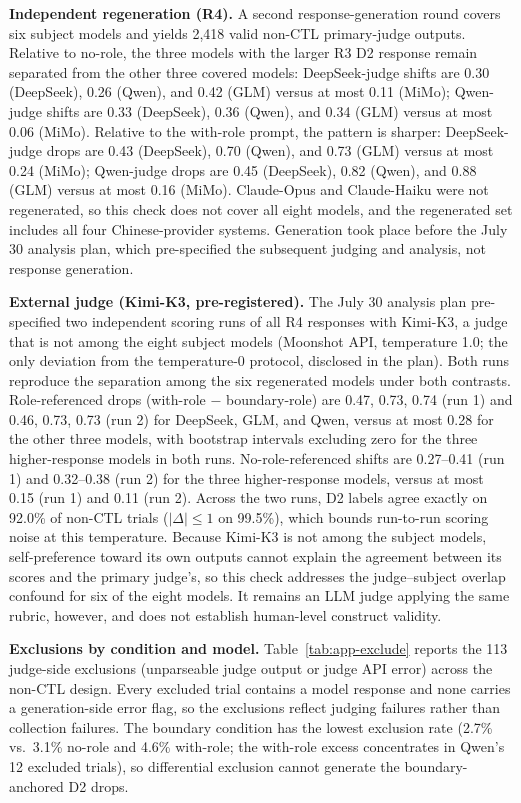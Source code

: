 \documentclass[11pt]{article}
\begin{document}
\textbf{Independent regeneration (R4).} A second response-generation round covers six subject models and yields 2,418 valid non-CTL primary-judge outputs. Relative to no-role, the three models with the larger R3 D2 response remain separated from the other three covered models: DeepSeek-judge shifts are 0.30 (DeepSeek), 0.26 (Qwen), and 0.42 (GLM) versus at most 0.11 (MiMo); Qwen-judge shifts are 0.33 (DeepSeek), 0.36 (Qwen), and 0.34 (GLM) versus at most 0.06 (MiMo). Relative to the with-role prompt, the pattern is sharper: DeepSeek-judge drops are 0.43 (DeepSeek), 0.70 (Qwen), and 0.73 (GLM) versus at most 0.24 (MiMo); Qwen-judge drops are 0.45 (DeepSeek), 0.82 (Qwen), and 0.88 (GLM) versus at most 0.16 (MiMo). Claude-Opus and Claude-Haiku were not regenerated, so this check does not cover all eight models, and the regenerated set includes all four Chinese-provider systems. Generation took place before the July 30 analysis plan, which pre-specified the subsequent judging and analysis, not response generation.

\textbf{External judge (Kimi-K3, pre-registered).} The July 30 analysis plan pre-specified two independent scoring runs of all R4 responses with Kimi-K3, a judge that is not among the eight subject models (Moonshot API, temperature 1.0; the only deviation from the temperature-0 protocol, disclosed in the plan). Both runs reproduce the separation among the six regenerated models under both contrasts. Role-referenced drops (with-role $-$ boundary-role) are 0.47, 0.73, 0.74 (run 1) and 0.46, 0.73, 0.73 (run 2) for DeepSeek, GLM, and Qwen, versus at most 0.28 for the other three models, with bootstrap intervals excluding zero for the three higher-response models in both runs. No-role-referenced shifts are 0.27--0.41 (run 1) and 0.32--0.38 (run 2) for the three higher-response models, versus at most 0.15 (run 1) and 0.11 (run 2). Across the two runs, D2 labels agree exactly on 92.0\% of non-CTL trials ($|\Delta| \leq 1$ on 99.5\%), which bounds run-to-run scoring noise at this temperature. Because Kimi-K3 is not among the subject models, self-preference toward its own outputs cannot explain the agreement between its scores and the primary judge's, so this check addresses the judge--subject overlap confound for six of the eight models. It remains an LLM judge applying the same rubric, however, and does not establish human-level construct validity.

\textbf{Exclusions by condition and model.} Table~\ref{tab:app-exclude} reports the 113 judge-side exclusions (unparseable judge output or judge API error) across the non-CTL design. Every excluded trial contains a model response and none carries a generation-side error flag, so the exclusions reflect judging failures rather than collection failures. The boundary condition has the lowest exclusion rate (2.7\% vs.\ 3.1\% no-role and 4.6\% with-role; the with-role excess concentrates in Qwen's 12 excluded trials), so differential exclusion cannot generate the boundary-anchored D2 drops.
\end{document}
